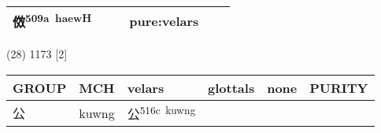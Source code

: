 \documentclass[14pt,a4paper]{scrartcl}
\begin{document}
\begin{longtable}[c]{@{}llllll@{}}
\begin{minipage}[t]{0.14\columnwidth}
傚\textsuperscript{509a~haewH}
\strut\end{minipage} &
\begin{minipage}[t]{0.14\columnwidth}\raggedright\strut
\strut\end{minipage} &
\begin{minipage}[t]{0.14\columnwidth}\raggedright\strut
\strut\end{minipage} &
\begin{minipage}[t]{0.14\columnwidth}\raggedright\strut
pure:velars
\strut\end{minipage}\tabularnewline
\bottomrule
\end{longtable}

(28) 1173 {[}2{]}

\begin{longtable}[c]{@{}llllll@{}}
\toprule
\begin{minipage}[b]{0.14\columnwidth}\raggedright\strut
GROUP
\strut\end{minipage} &
\begin{minipage}[b]{0.14\columnwidth}\raggedright\strut
MCH
\strut\end{minipage} &
\begin{minipage}[b]{0.14\columnwidth}\raggedright\strut
velars
\strut\end{minipage} &
\begin{minipage}[b]{0.14\columnwidth}\raggedright\strut
glottals
\strut\end{minipage} &
\begin{minipage}[b]{0.14\columnwidth}\raggedright\strut
none
\strut\end{minipage} &
\begin{minipage}[b]{0.14\columnwidth}\raggedright\strut
PURITY
\strut\end{minipage}\tabularnewline
\midrule
\endhead
\begin{minipage}[t]{0.14\columnwidth}\raggedright\strut
公
\strut\end{minipage} &
\begin{minipage}[t]{0.14\columnwidth}\raggedright\strut
kuwng
\strut\end{minipage} &
\begin{minipage}[t]{0.14\columnwidth}\raggedright\strut
公\textsuperscript{516c~kuwng}
\strut\end{minipage} &
\begin{minipage}[t]{0.14\columnwidth}\raggedright\strut
\strut\end{minipage} &
\begin{minipage}[t]{0.14\columnwidth}\raggedright\strut

\end{minipage}
\end{longtable}
\end{document}
